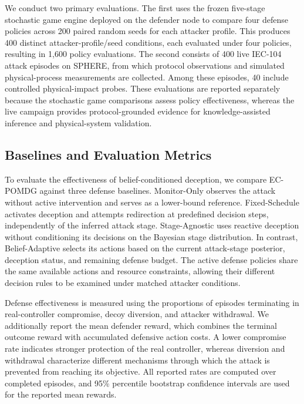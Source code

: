 \documentclass[10pt,conference]{IEEEtran}
\begin{document}
We conduct two primary evaluations. The first uses the frozen five-stage stochastic game engine deployed on the defender node to compare four defense policies across 200 paired random seeds for each attacker profile. This produces 400 distinct attacker-profile/seed conditions, each evaluated under four policies, resulting in 1,600 policy evaluations. The second consists of 400 live IEC-104 attack episodes on SPHERE, from which protocol observations and simulated physical-process measurements are collected. Among these episodes, 40 include controlled physical-impact probes. These evaluations are reported separately because the stochastic game comparisons assess policy effectiveness, whereas the live campaign provides protocol-grounded evidence for knowledge-assisted inference and physical-system validation.

\subsection{Baselines and Evaluation Metrics}

To evaluate the effectiveness of belief-conditioned deception, we compare EC-POMDG against three defense baselines. Monitor-Only observes the attack without active intervention and serves as a lower-bound reference. Fixed-Schedule activates deception and attempts redirection at predefined decision steps, independently of the inferred attack stage. Stage-Agnostic uses reactive deception without conditioning its decisions on the Bayesian stage distribution. In contrast, Belief-Adaptive selects its actions based on the current attack-stage posterior, deception status, and remaining defense budget. The active defense policies share the same available actions and resource constraints, allowing their different decision rules to be examined under matched attacker conditions.

Defense effectiveness is measured using the proportions of episodes terminating in real-controller compromise, decoy diversion, and attacker withdrawal. We additionally report the mean defender reward, which combines the terminal outcome reward with accumulated defensive action costs. A lower compromise rate indicates stronger protection of the real controller, whereas diversion and withdrawal characterize different mechanisms through which the attack is prevented from reaching its objective. All reported rates are computed over completed episodes, and 95\% percentile bootstrap confidence intervals are used for the reported mean rewards.
\end{document}
